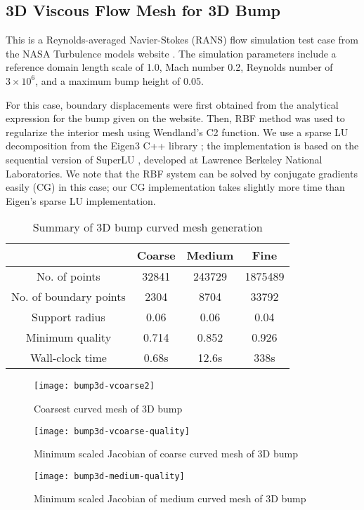 \FloatBarrier

\subsection{3D Viscous Flow Mesh for 3D Bump}
This is a Reynolds-averaged Navier-Stokes (RANS) flow simulation test case from the NASA Turbulence models website \cite{case:bump3d}. The simulation parameters include a reference domain length scale of 1.0, Mach number 0.2, Reynolds number of $3\times 10^6$, and a  maximum bump height of 0.05.

For this case, boundary displacements were first obtained from the analytical expression for the bump given on the website. Then, RBF method was used to regularize the interior mesh using Wendland's C2 function. We use a sparse LU decomposition from the Eigen3 C++ library \cite{eigenweb}; the implementation is based on the sequential version of SuperLU \cite{superlu}, developed at Lawrence Berkeley National Laboratories. We note that the RBF system can be solved by conjugate gradients easily (CG) in this case; our CG implementation takes slightly more time than Eigen's sparse LU implementation.

\begin{table}[!h]
\centering
\begin{tabular}{|c|c|c|c|}
	\hline
	  & Coarse & Medium & Fine \\
	 \hline
	 No. of points 				& 32841 & 243729	& 1875489 \\
	 No. of boundary points		& 2304	& 8704		& 33792 \\
	 Support radius				& 0.06	& 0.06		& 0.04 \\
	 Minimum quality			& 0.714	& 0.852		& 0.926 \\
	 Wall-clock time			& 0.68s	& 12.6s		& 338s \\
	 \hline
\end{tabular}
\caption{Summary of 3D bump curved mesh generation}
\end{table}

\begin{figure}
 \centering
 \texttt{[image: bump3d-vcoarse2]}
 \caption{Coarsest curved mesh of 3D bump}
 \label{fig:bump3d}
\end{figure}

\begin{figure}
	\centering
	\texttt{[image: bump3d-vcoarse-quality]}
	\caption{Minimum scaled Jacobian of coarse curved mesh of 3D bump}
	\label{fig:bump3d-coarse-jac}
\end{figure}
\begin{figure}
	\centering
	\texttt{[image: bump3d-medium-quality]}
	\caption{Minimum scaled Jacobian of medium curved mesh of 3D bump}
	\label{fig:bump3d-medium-jac}
\end{figure}

